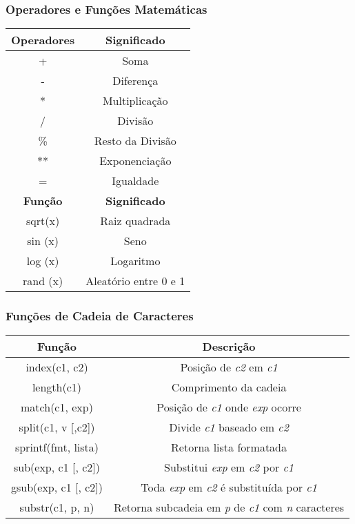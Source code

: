 \documentclass{beamer}
\begin{document}
   \begin{frame}
      \frametitle{Operadores e Funções Matemáticas}

      \begin{table}
         \begin{tabular}{c|c}
         \textbf{Operadores} & \textbf{Significado} \\
	 \hline
         + & Soma \\
	 - & Diferença \\
	 * & Multiplicação \\
	 / & Divisão \\
	 \% & Resto da Divisão \\
	 ** & Exponenciação \\
	 = & Igualdade \\
	 \hline 
	 \textbf{Função} & \textbf{Significado} \\
	 \hline
          sqrt(x) & Raiz quadrada \\
	  sin (x) & Seno \\
	  log (x) & Logaritmo \\
	  rand (x) & Aleatório entre 0 e 1 \\
         \end{tabular}
      \end{table}
   \end{frame}


   \begin{frame}
      \frametitle{Funções de Cadeia de Caracteres}
      \begin{table}
         \begin{tabular}{c|c}
         \textbf{Função} & \textbf{Descrição} \\
         \hline
            index(c1, c2) & Posição de \textit{c2} em \textit{c1} \\
	 length(c1) & Comprimento da cadeia \\ 
            match(c1, exp) & Posição de \textit{c1} onde \textit{exp} ocorre \\
            split(c1, v [,c2]) & Divide \textit{c1} baseado em \textit{c2} \\
	 sprintf(fmt, lista) & Retorna lista formatada \\
            sub(exp, c1 [, c2]) & Substitui \textit{exp} em \textit{c2} por \textit{c1} \\
            gsub(exp, c1 [, c2]) & Toda \textit{exp} em \textit{c2} é substituída por \textit{c1} \\
            substr(c1, p, n) & Retorna subcadeia em \textit{p} de \textit{c1} com \textit{n} caracteres \\
         \hline
         \end{tabular}
      \end{table}
   \end{frame}
\end{document}
